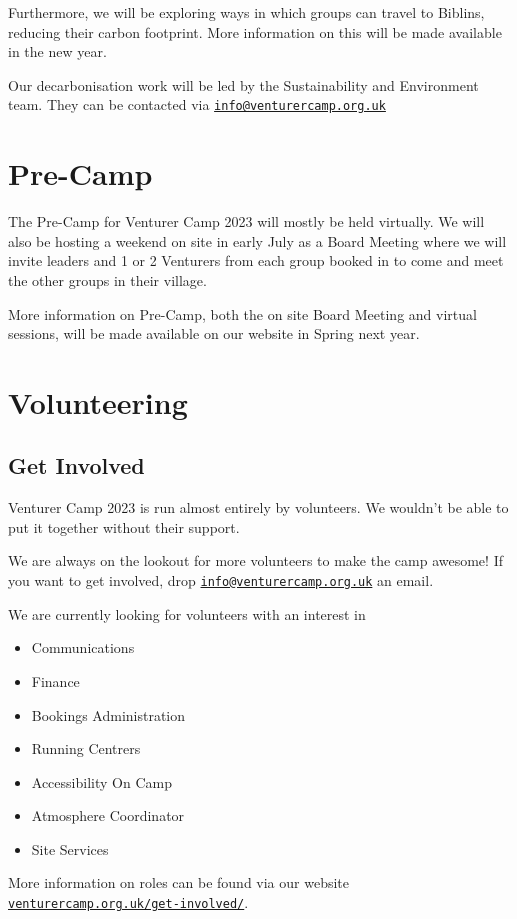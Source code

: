 \documentclass[a4paper, 10pt]{report}
\begin{document}
Furthermore, we will be exploring ways in which groups can travel to Biblins, reducing their carbon footprint. More information on this will be made available in the new year.

Our decarbonisation work will be led by the Sustainability and Environment team. They can be contacted via \href{mailto:info@venturercamp.org.uk}{\texttt{info@venturercamp.org.uk}}

\chapter{Pre-Camp}
The Pre-Camp for Venturer Camp 2023 will mostly be held virtually. We will also be hosting a weekend on site in early July as a Board Meeting where we will invite leaders and 1 or 2 Venturers from each group booked in to come and meet the other groups in their village.

More information on Pre-Camp, both the on site Board Meeting and virtual sessions, will be made available on our website in Spring next year. 

\chapter{Volunteering}
\section{Get Involved}
Venturer Camp 2023 is run almost entirely by volunteers. We wouldn't be able to put it together without their support.

We are always on the lookout for more volunteers to make  the camp awesome! If you want to get involved, drop \href{mailto:info@venturercamp.org.uk}{\texttt{info@venturercamp.org.uk}} an email.

We are currently looking for volunteers with an interest in
\begin{itemize}
    \item Communications
    \item Finance
    \item Bookings Administration
    \item Running Centrers
    \item Accessibility On Camp
    \item Atmosphere Coordinator
    \item Site Services
\end{itemize}
More information on roles can be found via our website \href{https://venturercamp.org.uk/get-involved/}{\texttt{venturercamp.org.uk/get-involved/}}. 
\end{document}
